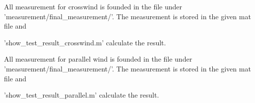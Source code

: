 All measurement for crosswind is founded in the file under 'measurement/final_measurement/'. The measurement is stored in the given mat file and 

'show_test_result_crosswind.m' calculate the result.

All measurement for parallel wind is founded in the file under 'measurement/final_measurement/'. The measurement is stored in the given mat file and 

'show_test_result_parallel.m' calculate the result.